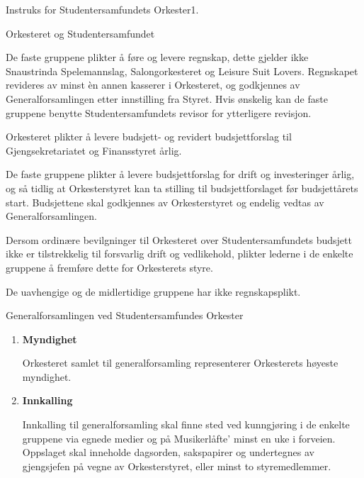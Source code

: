 \begin{instruks}{Instruks for Studentersamfundets Orkester}{1. }{ }
\begin{instruksledd}{Orkesteret og Studentersamfundet}
\begin{enumerate}
\begin{enumerate}
                        De faste gruppene plikter å føre og levere regnskap, dette gjelder ikke Snaustrinda
                        Spelemannslag, Salongorkesteret og Leisure Suit Lovers. Regnskapet revideres av minst èn annen
                        kasserer i
                        Orkesteret, og godkjennes av Generalforsamlingen etter innstilling fra Styret. Hvis ønskelig kan de
                        faste
                        gruppene benytte Studentersamfundets revisor for ytterligere revisjon.

                        Orkesteret plikter å levere budsjett- og revidert budsjettforslag til Gjengsekretariatet og
                        Finansstyret årlig.

                        De faste gruppene plikter å levere budsjettforslag for drift og investeringer årlig, og så tidlig at
                        Orkesterstyret
                        kan ta stilling til budsjettforslaget før budsjettårets start. Budsjettene skal godkjennes av
                        Orkesterstyret og
                        endelig vedtas av Generalforsamlingen.

                        Dersom ordinære bevilgninger til Orkesteret over Studentersamfundets budsjett ikke er tilstrekkelig
                        til
                        forsvarlig drift og vedlikehold, plikter lederne i de enkelte gruppene å fremføre dette for
                        Orkesterets styre.

                        De uavhengige og de midlertidige gruppene har ikke regnskapsplikt.
                \end{enumerate}
        \end{enumerate}
    \end{instruksledd}

    \begin{instruksledd}{Generalforsamlingen ved Studentersamfundes Orkester}
        \begin{enumerate}
            \item \textbf{Myndighet}

                Orkesteret samlet til generalforsamling representerer Orkesterets høyeste myndighet.

            \item \textbf{Innkalling}

                Innkalling til generalforsamling skal finne sted ved kunngjøring i de enkelte gruppene via
                egnede medier og
                på Musikerlåfte' minst en uke i forveien. Oppslaget skal inneholde dagsorden, sakspapirer og
                undertegnes av
                gjengsjefen på vegne av Orkesterstyret, eller minst to styremedlemmer.


\end{enumerate}
\end{instruksledd}
\end{instruks}
